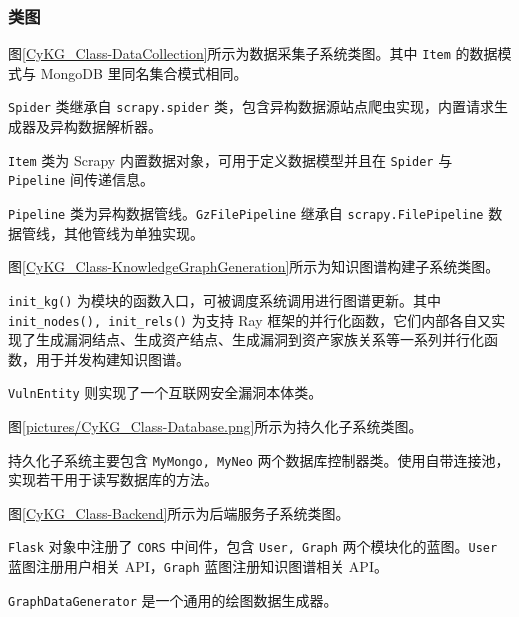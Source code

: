 \documentclass[a4paper,AutoFakeBold,oneside,12pt]{book}
\begin{document}
\subsubsection{类图}

图\ref{CyKG_Class-DataCollection}所示为数据采集子系统类图。其中 \lstinline|Item| 的数据模式与 MongoDB 里同名集合模式相同。

\lstinline|Spider| 类继承自 \lstinline|scrapy.spider| 类，包含异构数据源站点爬虫实现，内置请求生成器及异构数据解析器。

\lstinline|Item| 类为 Scrapy 内置数据对象，可用于定义数据模型并且在 \lstinline|Spider| 与 \lstinline|Pipeline| 间传递信息。

\lstinline|Pipeline| 类为异构数据管线。\lstinline|GzFilePipeline| 继承自 \lstinline|scrapy.FilePipeline| 数据管线，其他管线为单独实现。


图\ref{CyKG_Class-KnowledgeGraphGeneration}所示为知识图谱构建子系统类图。

\lstinline|init_kg()| 为模块的函数入口，可被调度系统调用进行图谱更新。其中 \lstinline|init_nodes(), init_rels()| 为支持 Ray 框架的并行化函数，它们内部各自又实现了生成漏洞结点、生成资产结点、生成漏洞到资产家族关系等一系列并行化函数，用于并发构建知识图谱。

\lstinline|VulnEntity| 则实现了一个互联网安全漏洞本体类。


图\ref{pictures/CyKG_Class-Database.png}所示为持久化子系统类图。

持久化子系统主要包含 \lstinline|MyMongo, MyNeo| 两个数据库控制器类。使用自带连接池，实现若干用于读写数据库的方法。


图\ref{CyKG_Class-Backend}所示为后端服务子系统类图。

\lstinline|Flask| 对象中注册了 \lstinline|CORS| 中间件，包含 \lstinline|User, Graph| 两个模块化的蓝图。\lstinline|User| 蓝图注册用户相关 API，\lstinline|Graph| 蓝图注册知识图谱相关 API。

\lstinline|GraphDataGenerator| 是一个通用的绘图数据生成器。

\end{document}
